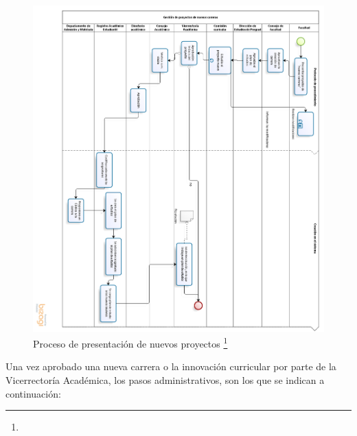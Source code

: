 			\begin{figure}[H]
			\centering
			\includegraphics[width=1\textwidth]{images/Capitulo_1/Procesos_Registro_academico.png}
			\caption[Proceso de presentación de nuevos proyectos]{Proceso de presentación de nuevos proyectos \footnote{}}
			\label{FiguraDOSCSM}
		\end{figure}
			

		
		Una vez aprobado una nueva carrera o la innovación curricular por parte de la Vicerrectoría Académica, los pasos administrativos, son los que se indican a continuación:
		
		
		
